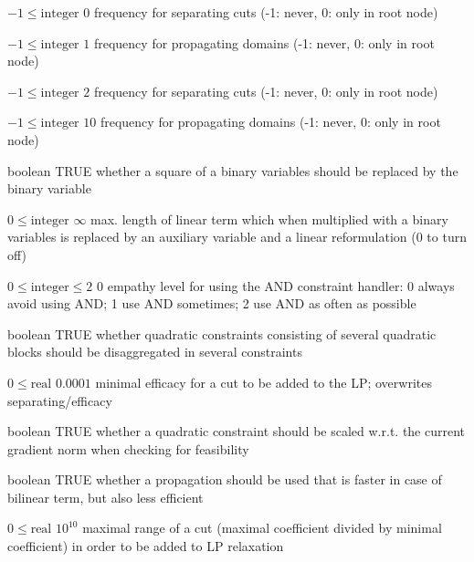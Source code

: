 %
{$-1\leq\textrm{integer}$}%
{$0$}%
{frequency for separating cuts (-1: never, 0: only in root node)}%
{}

%
{$-1\leq\textrm{integer}$}%
{$1$}%
{frequency for propagating domains (-1: never, 0: only in root node)}%
{}

%
{$-1\leq\textrm{integer}$}%
{$2$}%
{frequency for separating cuts (-1: never, 0: only in root node)}%
{}

%
{$-1\leq\textrm{integer}$}%
{$10$}%
{frequency for propagating domains (-1: never, 0: only in root node)}%
{}

%
{boolean}%
{TRUE}%
{whether a square of a binary variables should be replaced by the binary variable}%
{}

%
{$0\leq\textrm{integer}$}%
{$\infty$}%
{max. length of linear term which when multiplied with a binary variables is replaced by an auxiliary variable and a linear reformulation (0 to turn off)}%
{}

%
{$0\leq\textrm{integer}\leq2$}%
{$0$}%
{empathy level for using the AND constraint handler: 0 always avoid using AND; 1 use AND sometimes; 2 use AND as often as possible}%
{}

%
{boolean}%
{TRUE}%
{whether quadratic constraints consisting of several quadratic blocks should be disaggregated in several constraints}%
{}

%
{$0\leq\textrm{real}$}%
{$0.0001$}%
{minimal efficacy for a cut to be added to the LP; overwrites separating/efficacy}%
{}

%
{boolean}%
{TRUE}%
{whether a quadratic constraint should be scaled w.r.t. the current gradient norm when checking for feasibility}%
{}

%
{boolean}%
{TRUE}%
{whether a propagation should be used that is faster in case of bilinear term, but also less efficient}%
{}

%
{$0\leq\textrm{real}$}%
{$10^{ 10}$}%
{maximal range of a cut (maximal coefficient divided by minimal coefficient) in order to be added to LP relaxation}%
{}

